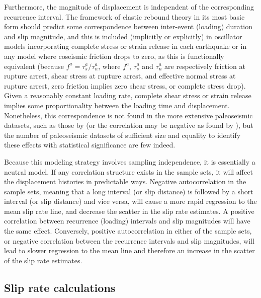 \documentclass[se]{copernicus}
\begin{document}
Furthermore, the magnitude of displacement is independent of the corresponding
recurrence interval. The framework of elastic rebound theory in its most basic
form should predict some correspondence between inter-event (loading) duration
and slip magnitude, and this is included (implicitly or explicitly) in
oscillator models incorporating complete stress or strain release in each
earthquake \citep[e.g.,][]{matthews_brownian_2002,dicaprio_post-seismic_2008}
or in any model where coseismic friction drops to zero, as this is functionally
equivalent (because \(f^a = \tau^a_s / \tau^a_n\), where \(f^a\), \(\tau^a_s\)
and \(\tau^a_n\) are respectively friction at rupture arrest, shear stress at
rupture arrest, and effective normal stress at rupture arrest, zero friction
implies zero shear stress, or complete stress drop). Given a reasonably
constant loading rate, complete shear stress or strain release implies some
proportionality between the loading time and displacement. Nonetheless, this
correspondence is not found in the more extensive paleoseismic datasets, such
as those by \citet{benedetti_earthquake_2013} (or the correlation may be
negative as found by \citet{weldon_wrightwood_2004}), but the number of
paleoseismic datasets of sufficient size and cquality to identify these effects
with statistical significance are few indeed.

Because this modeling strategy involves sampling independence, it is
essentially a neutral model. If any correlation structure exists in the
sample sets, it will affect the displacement histories in predictable
ways. Negative autocorrelation in the sample sets, meaning that a long
interval (or slip distance) is followed by a short interval (or slip
distance) and vice versa, will cause a more rapid regression to the mean
slip rate line, and decrease the scatter in the slip rate estimates. A
positive correlation between recurrence (loading) intervals and slip
magnitudes will have the same effect. Conversely, positive
autocorrelation in either of the sample sets, or negative correlation
between the recurrence intervals and slip magnitudes, will lead to
slower regression to the mean line and therefore an increase in the
scatter of the slip rate estimates.

\subsection{Slip rate calculations}\label{slip-rate-calculations}
\end{document}

